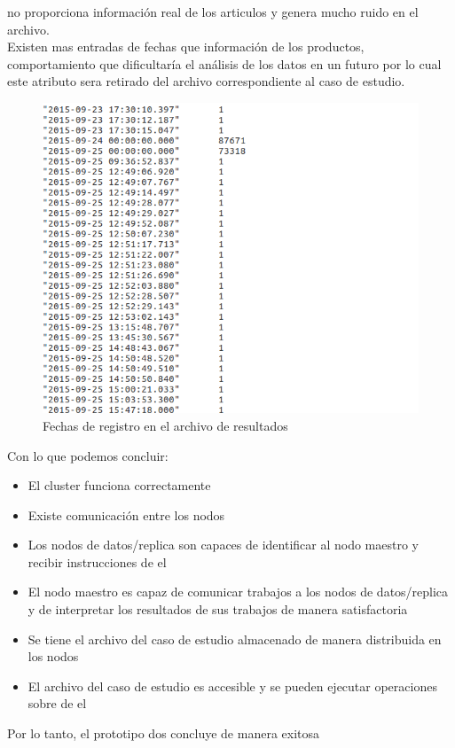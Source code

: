 no proporciona información real de los articulos y genera mucho ruido en el archivo.\\
Existen mas entradas de fechas que información de los productos, comportamiento que dificultaría el análisis de los
datos en un futuro por lo cual este atributo sera retirado del archivo correspondiente al caso de estudio.
\begin{figure}[!htbp]
	\hypertarget{fig:redi9}{\hspace{1pt}}
	\begin{center}
		\includegraphics[width=.9\textwidth]{capitulo4/images/ejemplo11.png}
		\caption{Fechas de registro en el archivo de resultados}
		\label{fig:redi10}
	\end{center}
\end{figure}
Con lo que podemos concluir:
\begin{itemize}
	\item El cluster funciona correctamente
	\item Existe comunicación entre los nodos
	\item Los nodos de datos/replica son capaces de identificar al nodo maestro y recibir instrucciones de el
	\item El nodo maestro es capaz de comunicar trabajos a los nodos de datos/replica y de interpretar los resultados de
	sus trabajos de manera satisfactoria
	\item Se tiene el archivo del caso de estudio almacenado de manera distribuida en los nodos
	\item El archivo del caso de estudio es accesible y se pueden ejecutar operaciones sobre de el
\end{itemize}
Por lo tanto, el prototipo dos concluye de manera exitosa